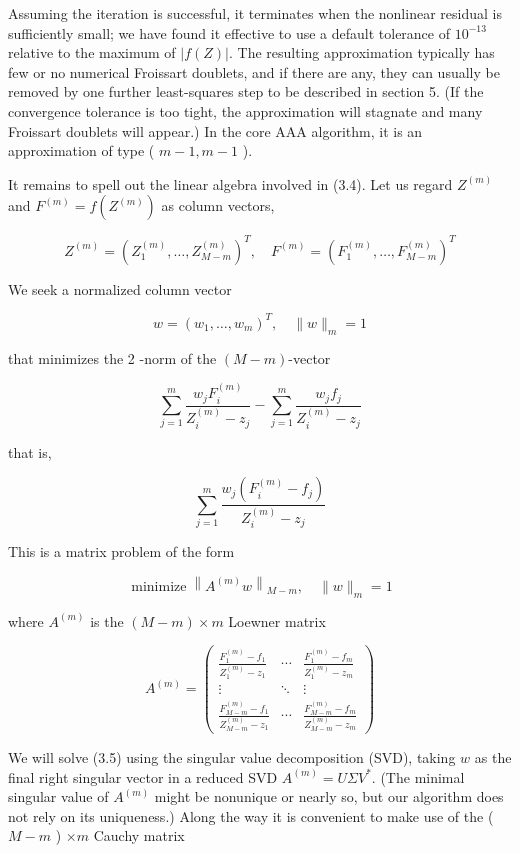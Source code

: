 \documentclass[11pt]{article}
\theoremstyle{definition}
\begin{document}
Assuming the iteration is successful, it terminates when the nonlinear residual is sufficiently small; we have found it effective to use a default tolerance of $10^{-13}$ relative to the maximum of $|f(Z)|$. The resulting approximation typically has few or no numerical Froissart doublets, and if there are any, they can usually be removed by one further least-squares step to be described in section 5. (If the convergence tolerance is too tight, the approximation will stagnate and many Froissart doublets will appear.) In the core AAA algorithm, it is an approximation of type ( $m-1, m-1$ ).

It remains to spell out the linear algebra involved in (3.4). Let us regard $Z^{(m)}$ and $F^{(m)}=f\left(Z^{(m)}\right)$ as column vectors,

$$
Z^{(m)}=\left(Z_{1}^{(m)}, \ldots, Z_{M-m}^{(m)}\right)^{T}, \quad F^{(m)}=\left(F_{1}^{(m)}, \ldots, F_{M-m}^{(m)}\right)^{T}
$$

We seek a normalized column vector

$$
w=\left(w_{1}, \ldots, w_{m}\right)^{T}, \quad\|w\|_{m}=1
$$

that minimizes the 2 -norm of the $(M-m)$-vector

$$
\sum_{j=1}^{m} \frac{w_{j} F_{i}^{(m)}}{Z_{i}^{(m)}-z_{j}}-\sum_{j=1}^{m} \frac{w_{j} f_{j}}{Z_{i}^{(m)}-z_{j}}
$$

that is,

$$
\sum_{j=1}^{m} \frac{w_{j}\left(F_{i}^{(m)}-f_{j}\right)}{Z_{i}^{(m)}-z_{j}}
$$

This is a matrix problem of the form


\begin{equation*}
\operatorname{minimize}\left\|A^{(m)} w\right\|_{M-m}, \quad\|w\|_{m}=1 \tag{3.5}
\end{equation*}


where $A^{(m)}$ is the $(M-m) \times m$ Loewner matrix 

\[
A^{(m)}=\left(\begin{array}{ccc}
\frac{F_{1}^{(m)}-f_{1}}{Z_{1}^{(m)}-z_{1}} & \cdots & \frac{F_{1}^{(m)}-f_{m}}{Z_{1}^{(m)}-z_{m}}  \tag{3.6}\\
\vdots & \ddots & \vdots \\
\frac{F_{M-m}^{(m)}-f_{1}}{Z_{M-m}^{(m)}-z_{1}} & \cdots & \frac{F_{M-m}^{(m)}-f_{m}}{Z_{M-m}^{(m)}-z_{m}}
\end{array}\right)
\]

We will solve (3.5) using the singular value decomposition (SVD), taking $w$ as the final right singular vector in a reduced SVD $A^{(m)}=U \Sigma V^{*}$. (The minimal singular value of $A^{(m)}$ might be nonunique or nearly so, but our algorithm does not rely on its uniqueness.) Along the way it is convenient to make use of the ( $M-m$ ) $\times m$ Cauchy matrix
\end{document}
